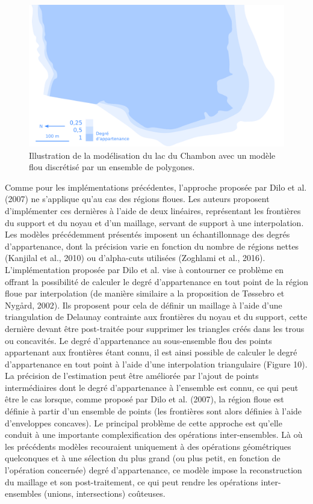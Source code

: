 \begin{figure}
  \centering
  \includegraphics{../figures/fig9.png}
  \caption{Illustration de la modélisation du lac du Chambon avec un modèle flou discrétisé par un ensemble de polygones.}
  \label{fig:champ_polygones}
\end{figure}

Comme pour les implémentations précédentes, l’approche proposée par
Dilo et al. (2007) ne s’applique qu’au cas des régions floues. Les
auteurs proposent d’implémenter ces dernières à l’aide de deux
linéaires, représentant les frontières du support et du noyau et d’un
maillage, servant de support à une interpolation. Les modèles
précédemment présentés imposent un échantillonnage des degrés
d’appartenance, dont la précision varie en fonction du nombre de
régions nettes (Kanjilal et al., 2010) ou d’alpha-cuts utilisées
(Zoghlami et al., 2016). L’implémentation proposée par Dilo et
al. vise à contourner ce problème en offrant la possibilité de
calculer le degré d’appartenance en tout point de la région floue par
interpolation (de manière similaire a la proposition de Tøssebro et
Nygård, 2002). Ils proposent pour cela de définir un maillage à l’aide
d’une triangulation de Delaunay contrainte aux frontières du noyau et
du support, cette dernière devant être post-traitée pour supprimer les
triangles créés dans les trous ou concavités. Le degré d’appartenance
au sous-ensemble flou des points appartenant aux frontières étant
connu, il est ainsi possible de calculer le degré d’appartenance en
tout point à l’aide d’une interpolation triangulaire (Figure 10). La
précision de l’estimation peut être améliorée par l’ajout de points
intermédiaires dont le degré d’appartenance à l’ensemble est connu, ce
qui peut être le cas lorsque, comme proposé par Dilo et al. (2007), la
région floue est définie à partir d’un ensemble de points (les
frontières sont alors définies à l’aide d’enveloppes concaves). Le
principal problème de cette approche est qu’elle conduit à une
importante complexification des opérations inter-ensembles. Là où les
précédents modèles recouraient uniquement à des opérations
géométriques quelconques et à une sélection du plus grand (ou plus
petit, en fonction de l’opération concernée) degré d’appartenance, ce
modèle impose la reconstruction du maillage et son post-traitement, ce
qui peut rendre les opérations inter-ensembles (unions, intersections)
coûteuses.

